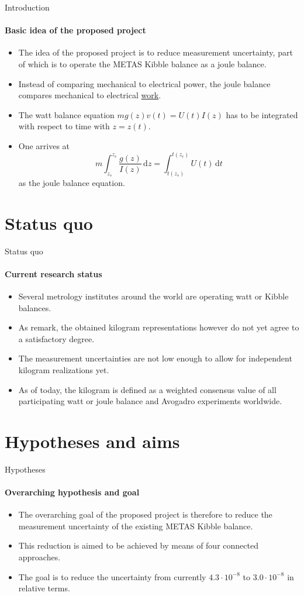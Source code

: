 \documentclass{beamer}
\begin{document}
\begin{frame}[allowframebreaks]{Introduction}
\framesubtitle{Basic idea of the proposed project}
\begin{itemize}
    \item The idea of the proposed project is to reduce measurement uncertainty, part of which is to operate the METAS Kibble balance as a joule balance.
    \item Instead of comparing mechanical to electrical power, the joule balance compares mechanical to electrical \underline{work}.
    \item The watt balance equation $mg(z)v(t) = U(t)I(z)$ has to be integrated with respect to time with $z=z(t)$.
    \item One arrives at \begin{equation}
        m\int_{z_s}^{z_e}\frac{g(z)}{I(z)}\,\mathrm{d}z = \int_{t(z_s)}^{t(z_e)}U(t)\,\mathrm{d}t
    \end{equation} as the joule balance equation.
\end{itemize}
\end{frame}


\section{Status quo}
\begin{frame}[allowframebreaks]{Status quo}
\framesubtitle{Current research status}
\begin{itemize}
\item Several metrology institutes around the world are operating watt or Kibble balances.
\item As \cite{Stock_2023} remark, the obtained kilogram representations however do not yet agree to a satisfactory degree.
\item The measurement uncertainties are not low enough to allow for independent kilogram realizations yet.
\item As of today, the kilogram is defined as a weighted consensus value of all participating watt or joule balance and Avogadro experiments worldwide.
\end{itemize}
\end{frame}

\section{Hypotheses and aims}
\begin{frame}[allowframebreaks]{Hypotheses}
  \framesubtitle{Overarching hypothesis and goal}
    \begin{itemize}
        \item The overarching goal of the proposed project is therefore to reduce the measurement uncertainty of the existing METAS Kibble balance.
        \item This reduction is aimed to be achieved by means of four connected approaches.
        \item The goal is to reduce the uncertainty from currently $4.3\cdot 10^{-8}$ to $3.0\cdot 10^{-8}$ in relative terms.
    \end{itemize}
\end{frame}
\end{document}
